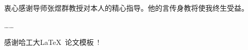 \begin{acknowledgements}
衷心感谢导师张煜群教授对本人的精心指导。他的言传身教将使我终生受益。

……

感谢哈工大\LaTeX\ 论文模板\hithesis\ !

\end{acknowledgements}
